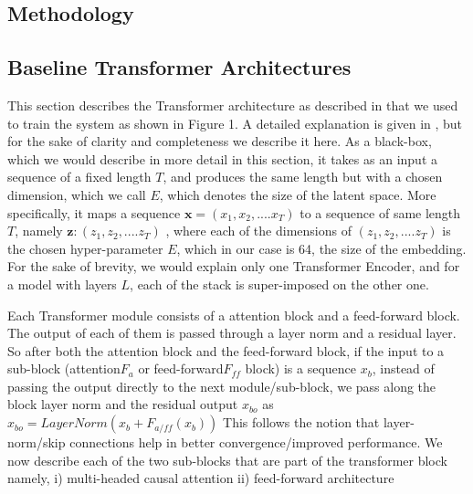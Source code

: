 \documentclass{article}
\begin{document}
\begin{sloppy}
\section{Methodology}
\label{sec:method}

\subsection{Baseline Transformer Architectures}
This section describes the Transformer architecture as described in \cite{vaswani2017attention} that we used to train the system as shown in Figure 1. A detailed explanation is given in \cite{opennmt}, but for the sake of clarity and completeness we describe it here. As a black-box, which we would describe in more detail in this section, it takes as an input a sequence of a fixed length $T$, and produces the same length but with a chosen dimension, which we call $E$, which denotes the size of the latent space. More specifically,  it maps a sequence $\textbf{x} = {(x_1, x_2, .... x_{T})}$ to a sequence of same length $T$,  namely $\textbf{z}: ({z_1, z_2, .... z_{T}})$ , where each of the dimensions of  $({z_1, z_2, .... z_{T}})$ is the chosen hyper-parameter $E$, which in our case is 64, the size of the embedding. For the sake of brevity, we would explain only one Transformer Encoder, and for a model with layers $L$, each of the stack is super-imposed on the other one. 


Each Transformer module consists of a attention block and a feed-forward block. The output of each of them is passed through a layer norm and a residual layer. So after both the attention block and the feed-forward block, if the input to a sub-block (attention$F_a$ or feed-forward$F_{ff}$ block) is a sequence $x_b$, instead of passing the output directly  to the next module/sub-block, we pass along the block layer norm and the residual output $x_{bo}$ as $ x_{bo}=LayerNorm (x_b + F_{a/ff}(x_b))$
This follows the notion that layer-norm/skip connections help in better convergence/improved performance. We now describe each of the two sub-blocks that are part of the transformer block namely, i) multi-headed causal attention ii) feed-forward architecture


\end{sloppy}
\end{document}
